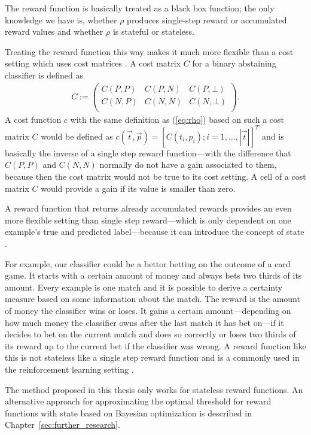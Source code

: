 \documentclass[twoside,11pt]{article}
\begin{document}
The reward function is basically treated as a black box
function; the only knowledge we have is, whether $\rho$
produces single-step reward or accumulated reward values
and whether $\rho$ is stateful or stateless.

Treating the reward function this way makes it much more
flexible than a cost setting which uses cost matrices
\citep[see][]{fisher_et_al_2016}. A cost matrix $C$ for a
binary abstaining classifier is defined as
\begin{align*}
  C :=
    \begin{pmatrix}
      C(P, P) &C(P, N) &C(P, \bot) \\
      C(N, P) &C(N, N) &C(N, \bot) \\
    \end{pmatrix}.
\end{align*}
A cost function $c$ with the same definition as
(\ref{eq:rho}) based on such a cost matrix $C$ would be
defined as $c(\vec{t}, \vec{p}) = [C(t_i, p_i);
i=1,\dots,|\vec{t}|]^T$ and is basically the inverse of a
single step reward function---with the difference that
$C(P, P)$ and $C(N, N)$ normally do not have a gain
associated to them, because then the cost matrix would not
be true to its cost setting.
A cell of a cost matrix $C$ would provide a gain if its
value is smaller than zero.

A reward function that returns already accumulated rewards
provides an even more flexible setting than single step
reward---which is only dependent on one example's true and
predicted label---because it can introduce the concept of
state \citep[see][Chapter 1]{sutton_et_al_2018}.

For example, our classifier could be a bettor betting on
the outcome of a card game.
It starts with a certain amount of money and always bets
two thirds of its amount.
Every example is one match and it is possible to derive a
certainty measure based on some information about the
match.
The reward is the amount of money the classifier wins or
loses.
It gains a certain amount---depending on how much money the
classifier owns after the last match it has bet on---if
it decides to bet on the current match and does so
correctly or loses two thirds of its reward up to the
current bet if the classifier was wrong.
A reward function like this is not stateless like a
single step reward function and is a commonly used
in the reinforcement learning setting
\citep[see][Chapter 1]{sutton_et_al_2018}.

The method proposed in this thesis only works for
stateless reward functions.
An alternative approach for approximating the optimal
threshold for reward functions with state based on
Bayesian optimization is described in
Chapter~\ref{sec:further_research}.
\end{document}
